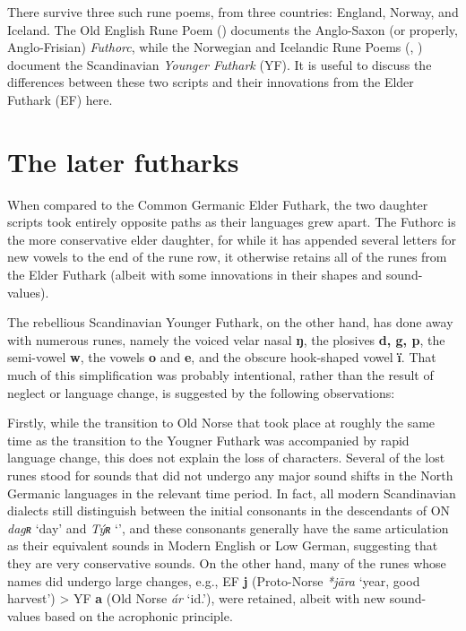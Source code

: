 There survive three such rune poems, from three countries: England, Norway, and Iceland.  The Old English Rune Poem () documents the Anglo-Saxon (or properly, Anglo-Frisian) \emph{Futhorc}, while the Norwegian and Icelandic Rune Poems (, ) document the Scandinavian \emph{Younger Futhark} (YF).  It is useful to discuss the differences between these two scripts and their innovations from the Elder Futhark (EF) here.

\section{The later futharks}

When compared to the Common Germanic Elder Futhark, the two daughter scripts took entirely opposite paths as their languages grew apart.  The Futhorc is the more conservative elder daughter, for while it has appended several letters for new vowels to the end of the rune row, it otherwise retains all of the runes from the Elder Futhark (albeit with some innovations in their shapes and sound-values).

The rebellious Scandinavian Younger Futhark, on the other hand, has done away with numerous runes, namely the voiced velar nasal \textbf{ŋ}, the plosives \textbf{d, g, p}, the semi-vowel \textbf{w}, the vowels \textbf{o} and \textbf{e}, and the obscure hook-shaped vowel \textbf{ï}.  That much of this simplification was probably intentional, rather than the result of neglect or language change, is suggested by the following observations:

Firstly, while the transition to Old Norse that took place at roughly the same time as the transition to the Yougner Futhark was accompanied by rapid language change, this does not explain the loss of characters.  Several of the lost runes stood for sounds that did not undergo any major sound shifts in the North Germanic languages in the relevant time period.  In fact, all modern Scandinavian dialects still distinguish between the initial consonants in the descendants of ON \emph{dagʀ} ‘day’ and \emph{Týʀ} ‘’, and these consonants generally have the same articulation as their equivalent sounds in Modern English or Low German, suggesting that they are very conservative sounds.  On the other hand, many of the runes whose names did undergo large changes, e.g., EF \textbf{j} (Proto-Norse \emph{*jāra} ‘year, good harvest’) > YF \textbf{a} (Old Norse \emph{ár} ‘id.’), were retained, albeit with new sound-values based on the acrophonic principle.

